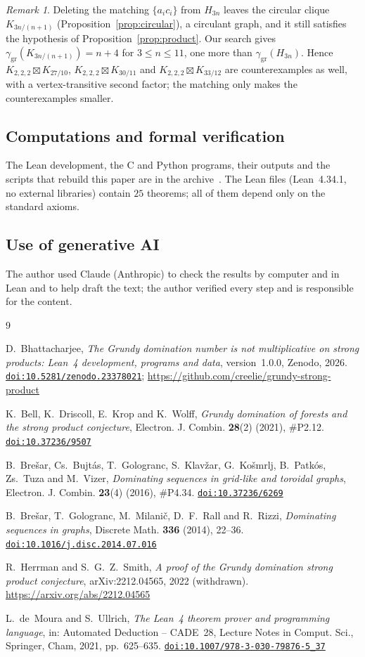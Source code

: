 \documentclass[11pt]{amsart}
\theoremstyle{definition}
\theoremstyle{remark}
\newtheorem{remark}[theorem]{Remark}
\numberwithin{equation}{section}
\newcommand{\doi}[1]{\href{https://doi.org/#1}{\nolinkurl{doi:#1}}}
\newcommand{\ggr}{\gamma_{\mathrm{gr}}}
\newcommand{\sprod}{\boxtimes}
\newcommand{\oct}{K_{2,2,2}}
\begin{document}
\begin{remark}
Deleting the matching $\{a_ic_i\}$ from $H_{3n}$ leaves the circular clique $K_{3n/(n+1)}$ (Proposition~\ref{prop:circular}), a circulant graph, and it still satisfies the hypothesis of Proposition~\ref{prop:product}. Our search gives $\ggr(K_{3n/(n+1)})=n+4$ for $3\le n\le11$, one more than $\ggr(H_{3n})$. Hence $\oct\sprod K_{27/10}$, $\oct\sprod K_{30/11}$ and $\oct\sprod K_{33/12}$ are counterexamples as well, with a vertex-transitive second factor; the matching only makes the counterexamples smaller.
\end{remark}

\subsection*{Computations and formal verification}
The Lean development, the C and Python programs, their outputs and the scripts that rebuild this paper are in the archive~\cite{Ar}. The Lean files (Lean~4.34.1, no external libraries) contain $25$ theorems; all of them depend only on the standard axioms.

\subsection*{Use of generative AI}
The author used Claude (Anthropic) to check the results by computer and in Lean and to help draft the text; the author verified every step and is responsible for the content.

\begin{thebibliography}{9}

D.~Bhattacharjee, \emph{The Grundy domination number is not multiplicative on strong products: Lean~4 development, programs and data}, version~1.0.0, Zenodo, 2026. \doi{10.5281/zenodo.23378021}; \url{https://github.com/creelie/grundy-strong-product}

K.~Bell, K.~Driscoll, E.~Krop and K.~Wolff, \emph{Grundy domination of forests and the strong product conjecture}, Electron. J. Combin. \textbf{28}(2) (2021), \#P2.12. \doi{10.37236/9507}

B.~Bre\v{s}ar, Cs.~Bujt\'as, T.~Gologranc, S.~Klav\v{z}ar, G.~Ko\v{s}mrlj, B.~Patk\'os, Zs.~Tuza and M.~Vizer, \emph{Dominating sequences in grid-like and toroidal graphs}, Electron. J. Combin. \textbf{23}(4) (2016), \#P4.34. \doi{10.37236/6269}

B.~Bre\v{s}ar, T.~Gologranc, M.~Milani\v{c}, D.~F.~Rall and R.~Rizzi, \emph{Dominating sequences in graphs}, Discrete Math. \textbf{336} (2014), 22--36. \doi{10.1016/j.disc.2014.07.016}

R.~Herrman and S.~G.~Z.~Smith, \emph{A proof of the Grundy domination strong product conjecture}, arXiv:2212.04565, 2022 (withdrawn). \url{https://arxiv.org/abs/2212.04565}

L.~de~Moura and S.~Ullrich, \emph{The Lean~4 theorem prover and programming language}, in: Automated Deduction -- CADE~28, Lecture Notes in Comput. Sci., Springer, Cham, 2021, pp.~625--635. \doi{10.1007/978-3-030-79876-5_37}

\end{thebibliography}
\end{document}
